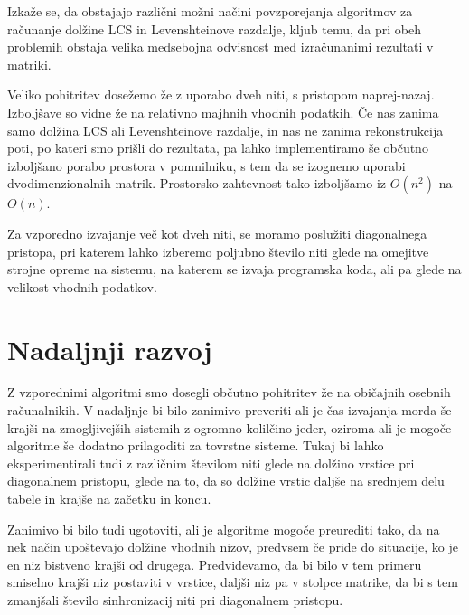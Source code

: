 \documentclass[a4paper,12pt,openright]{book}
\begin{document}
Izkaže se, da obstajajo različni možni načini povzporejanja algoritmov za računanje dolžine LCS in Levenshteinove razdalje, kljub temu, da pri obeh problemih obstaja velika medsebojna odvisnost med izračunanimi rezultati v matriki. 

Veliko pohitritev dosežemo že z uporabo dveh niti, s pristopom naprej-nazaj. Izboljšave so vidne že na relativno majhnih vhodnih podatkih. Če nas zanima samo dolžina LCS ali Levenshteinove razdalje, in nas ne zanima rekonstrukcija poti, po kateri smo prišli do rezultata, pa lahko implementiramo še občutno izboljšano porabo prostora v pomnilniku, s tem da se izognemo uporabi dvodimenzionalnih matrik. Prostorsko zahtevnost tako izboljšamo iz $O(n^2)$ na $O(n)$. 

Za vzporedno izvajanje več kot dveh niti, se moramo poslužiti diagonalnega pristopa, pri katerem lahko izberemo poljubno število niti glede na omejitve strojne opreme na sistemu, na katerem se izvaja programska koda, ali pa glede na velikost vhodnih podatkov. 

\section{Nadaljnji razvoj}

Z vzporednimi algoritmi smo dosegli občutno pohitritev že na običajnih osebnih računalnikih. V nadaljnje bi bilo zanimivo preveriti ali je čas izvajanja morda še krajši na zmogljivejših sistemih z ogromno kolilčino jeder, oziroma ali je mogoče algoritme še dodatno prilagoditi za tovrstne sisteme. Tukaj bi lahko eksperimentirali tudi z različnim številom niti glede na dolžino vrstice pri diagonalnem pristopu, glede na to, da so dolžine vrstic daljše na srednjem delu tabele in krajše na začetku in koncu. 

Zanimivo bi bilo tudi ugotoviti, ali je algoritme mogoče preurediti tako, da na nek način upoštevajo dolžine vhodnih nizov, predvsem če pride do situacije, ko je en niz bistveno krajši od drugega. Predvidevamo, da bi bilo v tem primeru smiselno krajši niz postaviti v vrstice, daljši niz pa v stolpce matrike, da bi s tem zmanjšali število sinhronizacij niti pri diagonalnem pristopu. 




\raggedright




\printbibliography[heading=bibintoc,title={Literatura}]
\end{document}
